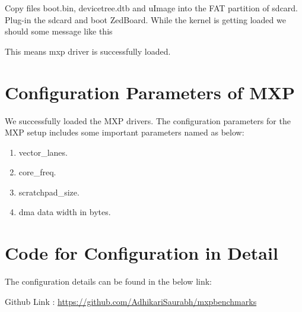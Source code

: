 Copy files boot.bin, devicetree.dtb and uImage into the FAT partition of sdcard. Plug-in the sdcard and boot ZedBoard. While the kernel is getting loaded we should some message like this



This means mxp driver is successfully loaded.

\section{Configuration Parameters of MXP}
We successfully loaded the MXP drivers. The configuration parameters for the MXP setup includes some important parameters named as below:
\begin{enumerate}

	\item vector\_lanes.

	\item core\_freq.

	\item scratchpad\_size.

	\item dma data width in bytes.
 
\end{enumerate}




\section{Code for Configuration in Detail}

The configuration details can be found in the below link:

Github Link : \url{https://github.com/AdhikariSaurabh/mxpbenchmarks}

